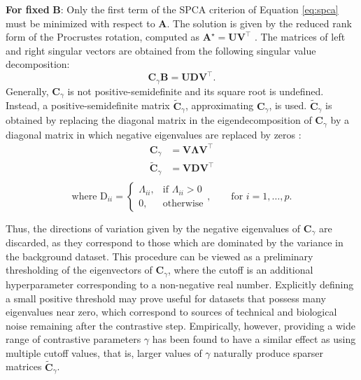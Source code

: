 \textbf{For fixed} $\mathbf{B}$: Only the first term of the SPCA criterion of
Equation \eqref{eq:spca} must be minimized with respect to $\mathbf{A}$. The
solution is given by the reduced rank form of the Procrustes rotation, computed
as $\mathbf{A}^\star = \mathbf{U}\mathbf{V}^\top$ \citep{Zou2006}. The matrices
of left and right singular vectors are obtained from the following singular
value decomposition:
\begin{equation*}
  \mathbf{C}_\gamma\mathbf{B} = \mathbf{U}\mathbf{D}\mathbf{V}^\top.
\end{equation*}
Generally, $\mathbf{C}_\gamma$ is not positive-semidefinite and its square root
is undefined. Instead, a positive-semidefinite matrix
$\widetilde{\mathbf{C}}_\gamma$, approximating $\mathbf{C}_\gamma$, is used.
$\widetilde{\mathbf{C}}_\gamma$ is obtained by replacing the diagonal matrix in
the eigendecomposition of $\mathbf{C}_\gamma$ by a diagonal matrix in which
negative eigenvalues are replaced by zeros \citep{elasticnet}:
\begin{align*}
  \mathbf{C}_\gamma &= \mathbf{V}\mathbf{\Lambda}\mathbf{V}^\top \\
  \widetilde{\mathbf{C}}_\gamma &= \mathbf{V}\mathbf{D}\mathbf{V}^\top \\
\end{align*}
\begin{equation*}
\text{where } \text{D}_{ii} =
  \begin{cases}
    \Lambda_{ii}, & \text{if $\Lambda_{ii} > 0$} \\
    0, & \text{otherwise}
  \end{cases},
  \qquad 
  \text{for } i = 1, \ldots, p.
\end{equation*}

Thus, the directions of variation given by the negative eigenvalues of
$\mathbf{C}_\gamma$ are discarded, as they correspond to those which are dominated by the variance in the background dataset. This procedure can be viewed as a preliminary thresholding of the eigenvectors of $\mathbf{C}_\gamma$,
where the cutoff is an additional hyperparameter corresponding to a non-negative
real number. Explicitly defining a small positive threshold may prove useful for
datasets that possess many eigenvalues near zero, which correspond to sources of
technical and biological noise remaining after the contrastive step.
Empirically, however, providing a wide range of contrastive parameters $\gamma$ has been found to have a similar effect as using
multiple cutoff values, that is, larger values of $\gamma$ naturally produce
sparser matrices $\widetilde{\mathbf{C}}_{\gamma}$.

